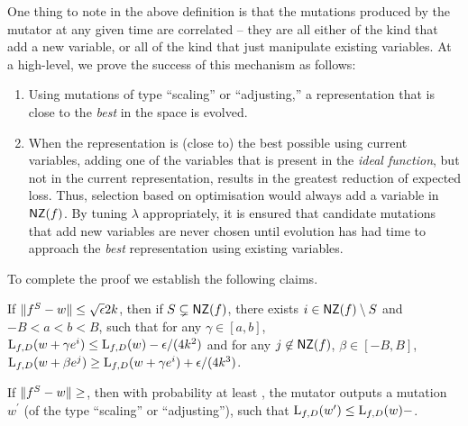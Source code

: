One thing to note in the above definition is that the mutations produced by the
mutator at any given time are correlated -- \ie they are all either of the kind that
add a new variable, or all of the kind that just manipulate existing variables.
At a high-level, we prove the success of this mechanism as follows:
\begin{enumerate}
\item Using mutations of type ``scaling'' or ``adjusting,'' a representation
that is close to the \emph{best} in the space is evolved.
\item When the representation is (close to) the best possible using current
variables, adding one of the variables that is present in the \emph{ideal
function}, but not in the current representation,
results in the greatest reduction of expected loss. Thus, selection
based on optimisation would always add a variable in $\mathsf{NZ}(f)$. By tuning
$\lambda$ appropriately, it is ensured that candidate mutations that add new
variables are never chosen until evolution has had time to approach the
\emph{best} representation using existing variables.
\end{enumerate}

To complete the proof we establish the following claims.

\begin{claim} \label{claim:date} If $\Vert f^S - w \Vert \leq
\sqrt{\epsilon}{2k}$, then if $S \subsetneq \mathsf{NZ}(f)$, there exists $i \in \mathsf{NZ}(f)
\setminus S$ and $-B < a < b < B$, such that for any $\gamma \in [a, b]$,
$\mathrm{L}_{f, D}(w + \gamma e^i) \leq \mathrm{L}_{f, D}(w) - \epsilon/(4k^2)$ and for
any $j \not\in \mathsf{NZ}(f)$, $\beta \in [-B, B]$, $\mathrm{L}_{f, D}(w + \beta e^j) \geq
\mathrm{L}_{f, D}(w + \gamma e^i) + \epsilon/(4k^3)$. \end{claim}

\begin{claim} \label{claim:elderberry} If $\Vert f^S - w \Vert \geq $, then with probability at least , the mutator outputs a
mutation $w^\prime$ (of the type ``scaling'' or ``adjusting''), such that
$\mathrm{L}_{f, D}(w^\prime) \leq \mathrm{L}_{f, D}(w) - $.  \end{claim}

